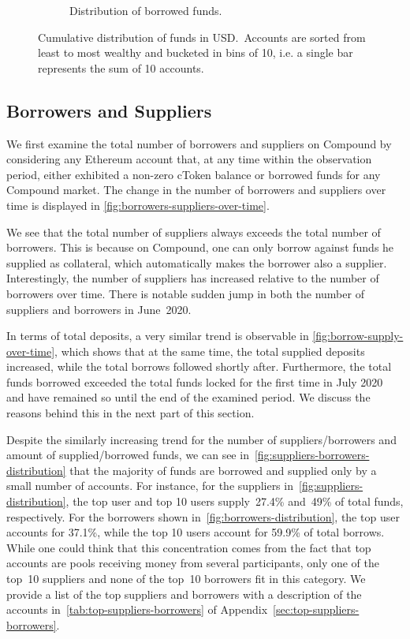 \begin{figure}[tbp]
\begin{subfigure}{.5\textwidth}
    \caption{Distribution of borrowed funds.}
    \label{fig:borrowers-distribution}
  \end{subfigure}
  \caption{Cumulative distribution of funds in USD.~Accounts are sorted from least to most wealthy and bucketed in bins of 10, i.e. a single bar represents the sum of 10 accounts.}\label{fig:suppliers-borrowers-distribution}
\end{figure}


\subsection{Borrowers and Suppliers}
We first examine the total number of borrowers and suppliers on Compound by considering any Ethereum account that, at any time within the observation period, either exhibited a non-zero cToken balance or borrowed funds for any Compound market.
The change in the number of borrowers and suppliers over time is displayed in \autoref{fig:borrowers-suppliers-over-time}.

We see that the total number of suppliers always exceeds the total number of borrowers. 
This is because on Compound, one can only borrow against funds he supplied as collateral, which automatically makes the borrower also a supplier. 
Interestingly, the number of suppliers has increased relative to the number of borrowers over time. 
There is notable sudden jump in both the number of suppliers and borrowers in June~2020.

In terms of total deposits, a very similar trend is observable in \autoref{fig:borrow-supply-over-time}, which shows that at the same time, the total supplied deposits increased, while the total borrows followed shortly after.
Furthermore, the total funds borrowed exceeded the total funds locked for the first time in July 2020 and have remained so until the end of the examined period.
We discuss the reasons behind this in the next part of this section.

Despite the similarly increasing trend for the number of suppliers/borrowers and amount of supplied/borrowed funds, we can see in~\autoref{fig:suppliers-borrowers-distribution} that the majority of funds are borrowed and supplied only by a small number of accounts.
For instance, for the suppliers in~\autoref{fig:suppliers-distribution}, the top user and top 10 users supply~27.4\% and~49\% of total funds, respectively.
For the borrowers shown in~\autoref{fig:borrowers-distribution}, the top user accounts for 37.1\%, while the top 10 users account for 59.9\% of total borrows.
While one could think that this concentration comes from the fact that top accounts are pools receiving money from several participants, only one of the top~10 suppliers and none of the top~10 borrowers fit in this category.
We provide a list of the top suppliers and borrowers with a description of the accounts in~\autoref{tab:top-suppliers-borrowers} of Appendix~\ref{sec:top-suppliers-borrowers}.


